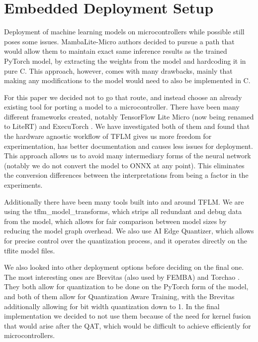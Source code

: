 \section{Embedded Deployment Setup}
\label{sec:experimental_setup}

Deployment of machine learning models on microcontrollers while possible still poses some issues. MambaLite-Micro authors decided to pursue a path that would allow them to maintain exact same inference results as the trained PyTorch model, by extracting the weights from the model and hardcoding it in pure C. This approach, however, comes with many drawbacks, mainly that making any modifications to the model would need to also be implemented in C.

For this paper we decided not to go that route, and instead choose an already existing tool for porting a model to a microcontroller. There have been many different frameworks created, notably TensorFlow Lite Micro (now being renamed to LiteRT) \cite{davidTensorFlowLiteMicro2021} and ExecuTorch \cite{executorch2026}. We have investigated both of them and found that the hardware agnostic workflow of TFLM gives us more freedom for experimentation, has better documentation and causes less issues for deployment. This approach allows us to avoid many intermediary forms of the neural network (notably we do not convert the model to ONNX at any point). This eliminates the conversion differences between the interpretations from being a factor in the experiments.

Additionally there have been many tools built into and around TFLM. We are using the tflm\_model\_transforms, which strips all redundant and debug data from the model, which allows for fair comparison between model sizes by reducing the model graph overhead. We also use AI Edge Quantizer, which allows for precise control over the quantization process, and it operates directly on the tflite model files.

We also looked into other deployment options before deciding on the final one. The most interesting ones are Brevitas \cite{brevitas} (also used by FEMBA) and Torchao \cite{orTorchAOPyTorchNativeTrainingtoServing2025}. They both allow for quantization to be done on the PyTorch form of the model, and both of them allow for Quantization Aware Training, with the Brevitas additionally allowing for bit width quantization down to 1. In the final implementation we decided to not use them because of the need for kernel fusion that would arise after the QAT, which would be difficult to achieve efficiently for microcontrollers.

